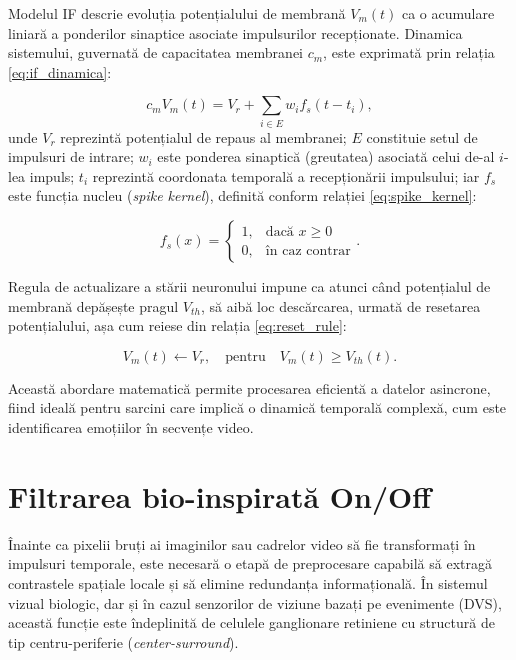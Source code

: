 Modelul IF descrie evoluția potențialului de membrană $V_m(t)$ ca o acumulare liniară a ponderilor sinaptice asociate impulsurilor recepționate. Dinamica sistemului, guvernată de capacitatea membranei $c_m$, este exprimată prin relația \eqref{eq:if_dinamica}:

\begin{equation}
\label{eq:if_dinamica}
c_m V_m(t) = V_r + \sum_{i \in E} w_i f_s(t - t_i),
\end{equation}
unde $V_r$ reprezintă potențialul de repaus al membranei; $E$ constituie setul de impulsuri de intrare; $w_i$ este ponderea sinaptică (greutatea) asociată celui de-al $i$-lea impuls; $t_i$ reprezintă coordonata temporală a recepționării impulsului; iar $f_s$ este funcția nucleu (\textit{spike kernel}), definită conform relației \eqref{eq:spike_kernel}:

\begin{equation}
\label{eq:spike_kernel}
f_s(x) = 
\begin{cases} 
1, & \text{dacă } x \geq 0 \\
0, & \text{în caz contrar}
\end{cases}.
\end{equation}

Regula de actualizare a stării neuronului impune ca atunci când potențialul de membrană depășește pragul $V_{th}$, să aibă loc descărcarea, urmată de resetarea po\-ten\-ți\-a\-lu\-lui, așa cum reiese din relația \eqref{eq:reset_rule}:

\begin{equation}
\label{eq:reset_rule}
V_m(t) \leftarrow V_r, \quad \text{pentru} \quad V_m(t) \geq V_{th}(t).
\end{equation}

Această abordare matematică permite procesarea eficientă a datelor asincrone, fiind ideală pentru sarcini care implică o dinamică temporală complexă, cum este identificarea emoțiilor în secvențe video.

\section{Filtrarea bio-inspirată On/Off}

Înainte ca pixelii bruți ai imaginilor sau cadrelor video să fie transformați în impulsuri temporale, este necesară o etapă de preprocesare capabilă să extragă contrastele spațiale locale și să elimine redundanța informațională. În sistemul vizual biologic, dar și în cazul senzorilor de viziune bazați pe evenimente (DVS), această funcție este îndeplinită de celulele ganglionare retiniene cu structură de tip centru-periferie (\textit{center-surround}). 

